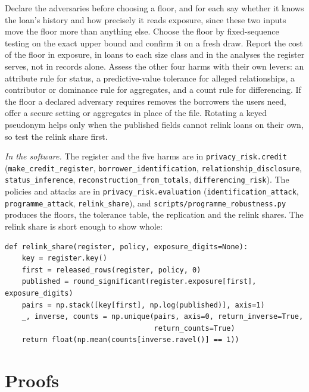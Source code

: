 \begin{inpractice}
Declare the adversaries before choosing a floor, and for each say whether it knows
the loan's history and how precisely it reads exposure, since these two inputs move
the floor more than anything else. Choose the floor by fixed-sequence testing on the
exact upper bound and confirm it on a fresh draw. Report the cost of the floor in
exposure, in loans to each size class and in the analyses the register serves, not
in records alone. Assess the other four harms with their own levers: an attribute
rule for status, a predictive-value tolerance for alleged relationships, a contributor
or dominance rule for aggregates, and a count rule for differencing. If the floor a
declared adversary requires removes the borrowers the users need, offer a secure
setting or aggregates in place of the file. Rotating a keyed pseudonym helps only when
the published fields cannot relink loans on their own, so test the relink share first.

\sloppy\smallskip\noindent\textit{In the software.} The register and the five harms are in
\texttt{privacy\_risk.credit} (\texttt{make\_credit\_register},
\texttt{borrower\_identification}, \texttt{relationship\_disclosure},
\texttt{status\_inference}, \texttt{reconstruction\_from\_totals},
\texttt{differencing\_risk}). The policies and attacks are in
\texttt{privacy\_risk.evaluation} (\texttt{identification\_attack},
\texttt{programme\_attack}, \texttt{relink\_share}), and
\texttt{scripts/programme\_robustness.py} produces the floors, the tolerance table, the
replication and the relink shares. The relink share is short enough to show whole:
\begin{lstlisting}
def relink_share(register, policy, exposure_digits=None):
    key = register.key()
    first = released_rows(register, policy, 0)
    published = round_significant(register.exposure[first], exposure_digits)
    pairs = np.stack([key[first], np.log(published)], axis=1)
    _, inverse, counts = np.unique(pairs, axis=0, return_inverse=True,
                                   return_counts=True)
    return float(np.mean(counts[inverse.ravel()] == 1))
\end{lstlisting}
\end{inpractice}

\section{Proofs}

